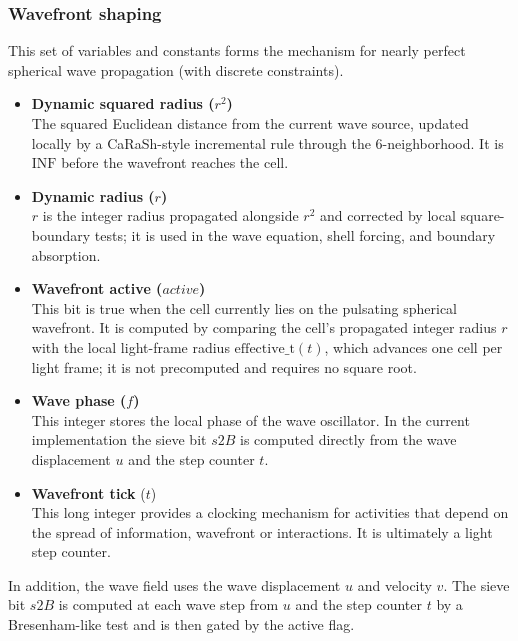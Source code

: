 \documentclass{ijuc}
\begin{document}
\subsubsection{Wavefront shaping}
This set of variables and constants forms the mechanism for nearly perfect spherical wave propagation (with discrete constraints).
\begin{itemize}
    \item \textbf{Dynamic squared radius ($r^{2}$)} \\
    The squared Euclidean distance from the current wave source, updated locally by a CaRaSh-style incremental rule through the 6-neighborhood. It is $\mathrm{INF}$ before the wavefront reaches the cell.

    \item \textbf{Dynamic radius ($r$)} \\
    $r$ is the integer radius propagated alongside $r^{2}$ and corrected by local square-boundary tests; it is used in the wave equation, shell forcing, and boundary absorption.

    \item \textbf{Wavefront active ($\mathit{active}$)} \\
    This bit is true when the cell currently lies on the pulsating spherical wavefront. It is computed by comparing the cell's propagated integer radius $r$ with the local light-frame radius $\mathrm{effective\_t}(t)$, which advances one cell per light frame; it is not precomputed and requires no square root.

    \item \textbf{Wave phase ($f$)} \\
    This integer stores the local phase of the wave oscillator. In the current implementation the sieve bit $s2B$ is computed directly from the wave displacement $u$ and the step counter $t$.

    \item \textbf{Wavefront tick} ($t$)\\
     This long integer provides a clocking mechanism for activities that depend on the spread of information, wavefront or interactions. It is ultimately a light step counter.
 \end{itemize}

In addition, the wave field uses the wave displacement $u$ and velocity $v$. The sieve bit $s2B$ is computed at each wave step from $u$ and the step counter $t$ by a Bresenham-like test and is then gated by the active flag.
\end{document}
